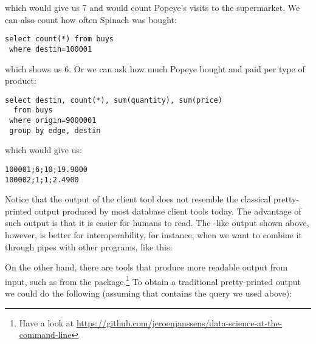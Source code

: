 
which would give us 7 and would count Popeye's visits to the supermarket.
We can also count how often Spinach was bought:

\begin{sqlcode}
\begin{lstlisting}
select count(*) from buys
 where destin=100001
\end{lstlisting}
\end{sqlcode}

which shows us 6.
Or we can ask how much Popeye bought and paid per type of product:

\begin{sqlcode}
\begin{lstlisting}
select destin, count(*), sum(quantity), sum(price)
  from buys
 where origin=9000001 
 group by edge, destin
\end{lstlisting}
\end{sqlcode}

\begin{minipage}{\textwidth}
which would give us:
\begin{verbatim}
100001;6;10;19.9000
100002;1;1;2.4900
\end{verbatim}
\end{minipage}

Notice that the output
of the client tool does not resemble the classical
pretty-printed output produced by most database
client tools today. The advantage of such output is
that it is easier for humans to read.
The -like output shown above, however,
is better for interoperability, for instance,
when we want to combine it through pipes
with other programs, like this:


On the other hand, there are tools that
produce more readable output from  input,
such as  from the  package.\footnote{Have
a look at
\url{https://github.com/jeroenjanssens/data-science-at-the-command-line}}
To obtain a traditional pretty-printed output we could do the following
(assuming that  contains the query we used above):


